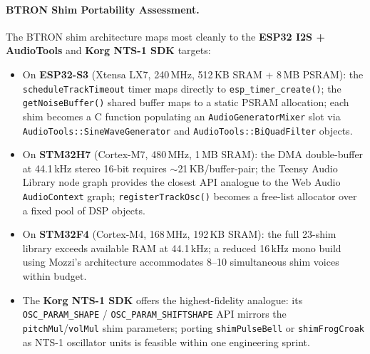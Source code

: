 \documentclass[10pt,journal,compsoc,twocolumn]{article}
\begin{document}
\paragraph{BTRON Shim Portability Assessment.}
The BTRON shim architecture maps most cleanly to the
\textbf{ESP32 I2S + AudioTools} and \textbf{Korg NTS-1 SDK} targets:
\begin{itemize}[leftmargin=*]
    \item On \textbf{ESP32-S3} (Xtensa LX7, 240\,MHz, 512\,KB SRAM +
    8\,MB PSRAM): the \texttt{scheduleTrackTimeout} timer maps directly
    to \texttt{esp\_timer\_create()}; the \texttt{getNoiseBuffer()} shared
    buffer maps to a static PSRAM allocation; each shim becomes a C
    function populating an \texttt{AudioGeneratorMixer} slot via
    \texttt{AudioTools::SineWaveGenerator} and
    \texttt{AudioTools::BiQuadFilter} objects.
    \item On \textbf{STM32H7} (Cortex-M7, 480\,MHz, 1\,MB SRAM):
    the DMA double-buffer at 44.1\,kHz stereo 16-bit requires
    $\sim$21\,KB/buffer-pair; the Teensy Audio Library node graph
    provides the closest API analogue to the Web Audio
    \texttt{AudioContext} graph; \texttt{registerTrackOsc()} becomes
    a free-list allocator over a fixed pool of DSP objects.
    \item On \textbf{STM32F4} (Cortex-M4, 168\,MHz, 192\,KB SRAM):
    the full 23-shim library exceeds available RAM at 44.1\,kHz;
    a reduced 16\,kHz mono build using Mozzi's architecture
    accommodates 8--10 simultaneous shim voices within budget.
    \item The \textbf{Korg NTS-1 SDK} offers the highest-fidelity
    analogue: its \texttt{OSC\_PARAM\_SHAPE} / \texttt{OSC\_PARAM\_SHIFTSHAPE}
    API mirrors the \texttt{pitchMul}/\texttt{volMul} shim parameters;
    porting \texttt{shimPulseBell} or \texttt{shimFrogCroak} as NTS-1
    oscillator units is feasible within one engineering sprint.
\end{itemize}
\end{document}

